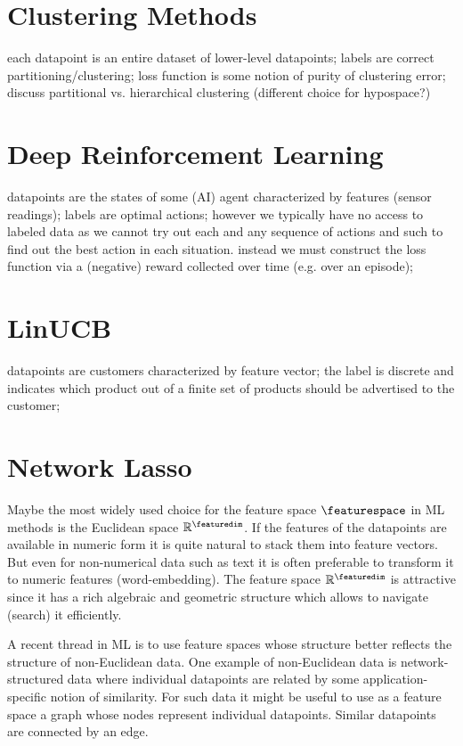 \documentclass[12pt]{report}
\begin{document}
\section{Clustering Methods} 
\label{sec_clustering_methods} 
each datapoint is an entire dataset of lower-level datapoints; 
labels are correct partitioning/clustering; loss function is some 
notion of purity of clustering error; discuss partitional vs. hierarchical 
clustering (different choice for hypospace?)


\section{Deep Reinforcement Learning}
\label{sec_reinflearning_methods}
datapoints are the states of some (AI) agent characterized by features (sensor readings); 
labels are optimal actions; however we typically have no access to labeled 
data as we cannot try out each and any sequence of actions and such to 
find out the best action in each situation. instead we must construct the 
loss function via a (negative) reward collected over time (e.g. over an episode); 

\section{LinUCB}
\label{sec_lin_ucb}
datapoints are customers characterized by feature vector; the label is 
discrete and indicates which product out of a finite set of products should 
be advertised to the customer; 

 
\section{Network Lasso} 
\label{sec_network_lasso}

Maybe the most widely used choice for the feature space $\featurespace$ in 
ML methods is the Euclidean space $\mathbb{R}^{\featuredim}$. If the features 
of the datapoints are available in numeric form it is quite natural to stack them 
into feature vectors. But even for non-numerical data such as text it is often 
preferable to transform it to numeric features (word-embedding). The feature 
space $\mathbb{R}^{\featuredim}$ is attractive since it has a rich algebraic and 
geometric structure which allows to navigate (search) it efficiently. 

A recent thread in ML is to use feature spaces whose structure better 
reflects the structure of non-Euclidean data. One example of non-Euclidean 
data is network-structured data where individual datapoints are related 
by some application-specific notion of similarity. For such data it might be useful 
to use as a feature space a graph whose nodes represent individual datapoints. 
Similar datapoints are connected by an edge. 
\end{document}
